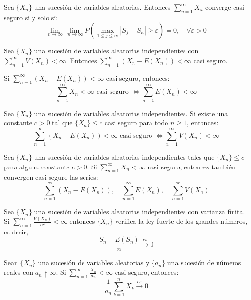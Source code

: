 \begin{lemma}
    Sea $\{X_n\}$ una sucesión de variables aleatorias.
    Entonces $\sum_{n=1}^\infty X_n$ converge casi seguro si y solo si:
    $$\lim\limits_{n \to \infty} \lim\limits_{m \to \infty} P(\max_{1 \leq j \leq m} |S_j - S_n| \geq \varepsilon) = 0, \quad \forall \varepsilon > 0$$
\end{lemma}

\begin{theorem}
    Sea $\{X_n\}$ una sucesión de variables aleatorias independientes con $\sum_{n=1}^\infty V(X_n) < \infty$.
    Entonces $\sum_{n=1}^\infty (X_n - E(X_n)) < \infty$ casi seguro.
\end{theorem}

\begin{remark}
    Si $\sum_{n=1}^\infty (X_n - E(X_n)) < \infty$ casi seguro, entonces:
    $$\sum_{n=1}^\infty X_n < \infty \text{ casi seguro } \Leftrightarrow \sum_{n=1}^\infty E(X_n) < \infty$$
\end{remark}

\begin{theorem}
    Sea $\{X_n\}$ una sucesión de variables aleatorias independientes.
    Si existe una constante $c > 0$ tal que $\{X_n\} \leq c$ casi seguro para todo $n \geq 1$, entonces:
    $$\sum_{n=1}^\infty (X_n - E(X_n)) < \infty \text{ casi seguro } \Leftrightarrow \sum_{n=1}^\infty V(X_n) < \infty$$
\end{theorem}

\begin{corollary}
    Sea $\{X_n\}$ una sucesión de variables aleatorias independientes tales que $\{X_n\} \leq c$ para alguna constante $c > 0$.
    Si $\sum_{n=1}^\infty X_n < \infty$ casi seguro, entonces también convergen casi seguro las series:
    $$\sum_{n=1}^\infty (X_n - E(X_n)), \quad \sum_{n=1}^\infty E(X_n), \quad \sum_{n=1}^\infty V(X_n)$$
\end{corollary}

\begin{theorem}
    Sea $\{X_n\}$ una sucesión de variables aleatorias independientes con varianza finita.
    Si $\sum_{n=1}^\infty \frac{V(X_n)}{n^2} < \infty$ entonces $\{X_n\}$ verifica la ley fuerte de los grandes números, es decir,
    $$\frac{S_n - E(S_n)}{n} \xrightarrow{cs} 0$$
\end{theorem}

\begin{lemma}[Kronecker]
    Sean $\{X_n\}$ una sucesión de variables aleatorias y $\{a_n\}$ una sucesión de números reales con $a_n \uparrow \infty$.
    Si $\sum_{n=1}^\infty \frac{X_n}{a_n} < \infty$ casi seguro, entonces:
    $$\frac{1}{a_n} \sum_{k=1}^n X_k \xrightarrow{cs} 0$$
\end{lemma}

